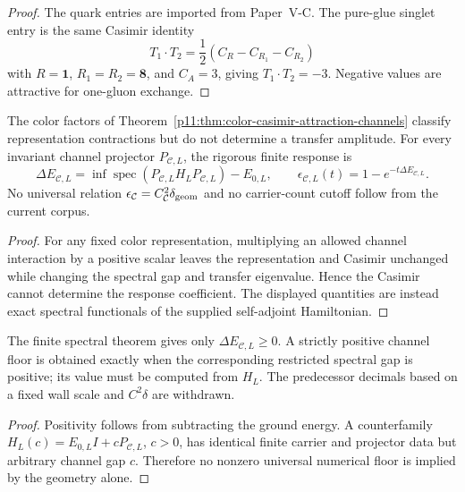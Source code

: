 \documentclass[12pt,a4paper]{article}
\providecommand{\deltageom}{\delta_{\rm geom}}
\begin{document}
\begin{proof}
The quark entries are imported from Paper~V-C.  The pure-glue singlet entry is
the same Casimir identity
\[
T_1\cdot T_2=\frac12(C_R-C_{R_1}-C_{R_2})
\]
with \(R=\mathbf1\), \(R_1=R_2=\mathbf8\), and \(C_A=3\), giving
\(T_1\cdot T_2=-3\).  Negative values are attractive for one-gluon exchange.
\end{proof}


\begin{theorem}
\label{p11:thm:primitive-channel-loss-hierarchy}
\label{p11:thm:primitive-strong-amplitude-loss-law}

The color factors of Theorem~\ref{p11:thm:color-casimir-attraction-channels} classify representation contractions but do not determine a transfer amplitude.  For every invariant channel projector \(P_{\mathcal C,L}\), the rigorous finite response is
\[
\Delta E_{\mathcal C,L}=\inf\operatorname{spec}(P_{\mathcal C,L}H_LP_{\mathcal C,L})-E_{0,L},
\qquad
\epsilon_{\mathcal C,L}(t)=1-e^{-t\Delta E_{\mathcal C,L}}.
\]
No universal relation \(\epsilon_{\mathcal C}=C_{\mathcal C}^2\deltageom\) and no carrier-count cutoff follow from the current corpus.
\label{p11:eq:primitive-channel-loss-rule}
\label{p11:eq:primitive-channel-weights}
\label{p11:eq:primitive-channel-amplitude-ratio}
\label{p11:eq:primitive-channel-loss-ratio}
\label{p11:eq:primitive-n-carrier-loss}
\end{theorem}
\begin{proof}

For any fixed color representation, multiplying an allowed channel interaction by a positive scalar leaves the representation and Casimir unchanged while changing the spectral gap and transfer eigenvalue.  Hence the Casimir cannot determine the response coefficient.  The displayed quantities are instead exact spectral functionals of the supplied self-adjoint Hamiltonian.
\end{proof}

\begin{corollary}
\label{p11:cor:numerical-primitive-channel-floors}

The finite spectral theorem gives only \(\Delta E_{\mathcal C,L}\ge0\).  A strictly positive channel floor is obtained exactly when the corresponding restricted spectral gap is positive; its value must be computed from \(H_L\).  The predecessor decimals based on a fixed wall scale and \(C^2\delta\) are withdrawn.

\end{corollary}
\begin{proof}

Positivity follows from subtracting the ground energy.  A counterfamily \(H_L(c)=E_{0,L}I+cP_{\mathcal C,L}\), \(c>0\), has identical finite carrier and projector data but arbitrary channel gap \(c\).  Therefore no nonzero universal numerical floor is implied by the geometry alone.
\end{proof}
\end{document}
